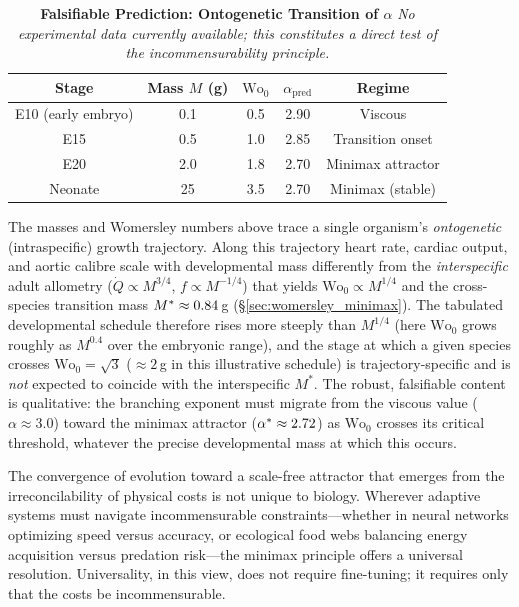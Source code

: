 \begin{table}[H]
\centering
\caption{\textbf{Falsifiable Prediction: Ontogenetic Transition of $\alpha$}
\emph{No experimental data currently available; this constitutes a direct test
of the incommensurability principle.}}
\label{tab:ontogenetic}
\begin{tabular}{ccccc}
\toprule
Stage & Mass $M$ (g) & $\mathrm{Wo}_0$ & $\alpha_{\mathrm{pred}}$ & Regime \\
\midrule
E10 (early embryo) & 0.1  & 0.5  & 2.90 & Viscous \\
E15                & 0.5  & 1.0  & 2.85 & Transition onset \\
E20                & 2.0  & 1.8  & 2.70 & Minimax attractor \\
Neonate            & 25   & 3.5  & 2.70 & Minimax (stable) \\
\bottomrule
\end{tabular}
\end{table}

The masses and Womersley numbers above trace a single organism's
\emph{ontogenetic} (intraspecific) growth trajectory. Along this trajectory
heart rate, cardiac output, and aortic calibre scale with developmental mass
differently from the \emph{interspecific} adult allometry ($\dot{Q}\propto
M^{3/4}$, $f\propto M^{-1/4}$) that yields $\mathrm{Wo}_0\propto M^{1/4}$ and
the cross-species transition mass $M^*\approx0.84\,$g
(\S\ref{sec:womersley_minimax}). The tabulated developmental schedule therefore
rises more steeply than $M^{1/4}$ (here $\mathrm{Wo}_0$ grows roughly as
$M^{0.4}$ over the embryonic range), and the stage at which a given species
crosses $\mathrm{Wo}_0=\sqrt{3}$ ($\approx 2\,$g in this illustrative schedule)
is trajectory-specific and is \emph{not} expected to coincide with the
interspecific $M^*$. The robust, falsifiable content is qualitative: the
branching exponent must migrate from the viscous value ($\alpha\approx 3.0$)
toward the minimax attractor ($\alpha^*\approx2.72$) as $\mathrm{Wo}_0$
crosses its critical threshold, whatever the precise developmental mass at which
this occurs.

The convergence of evolution toward a scale-free attractor that emerges from the
irreconcilability of physical costs is not unique to biology. Wherever adaptive
systems must navigate incommensurable constraints---whether in neural networks
optimizing speed versus accuracy, or ecological food webs balancing energy
acquisition versus predation risk---the minimax principle offers a universal
resolution. Universality, in this view, does not require fine-tuning; it
requires only that the costs be incommensurable.
